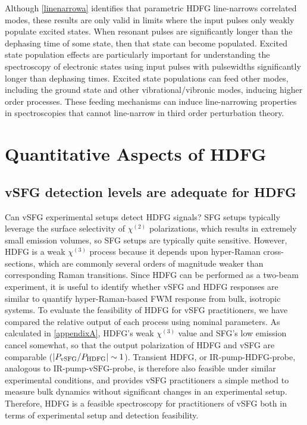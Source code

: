 \documentclass[aip, jcp, reprint, onecolumn, nofootinbib]{revtex4-2}
\begin{document}
Although \autoref{linenarrowa} identifies that parametric HDFG line-narrows correlated modes, these results are only valid in limits where the input pulses only weakly populate excited states.
When resonant pulses are significantly longer than the dephasing time of some state, then that state can become populated.
Excited state population effects are particularly important for understanding the spectroscopy of electronic states using input pulses with pulsewidths significantly longer than dephasing times. \cite{RN319, Yurs2012}
Excited state populations can feed other modes, including the ground state and other vibrational/vibronic modes, inducing higher order processes.\cite{Carlson87, RN471}
These feeding mechanisms can induce line-narrowing properties in spectroscopies that cannot line-narrow in third order perturbation theory.\cite{RN319, Carlson87, RN471}

\section{Quantitative Aspects of HDFG}\label{quant}
% 


\subsection{vSFG detection levels are adequate for HDFG}

Can vSFG experimental setups detect HDFG signals?
SFG setups typically leverage the surface selectivity of $\chi^{(2)}$ polarizations,\cite{RN132, RN133} which results in extremely small emission volumes, so SFG setups are typically quite sensitive.
However, HDFG is a weak $\chi^{(3)}$ process because it depends upon hyper-Raman cross-sections, which are commonly several orders of magnitude weaker than corresponding Raman transitions.\cite{RN515}
Since HDFG can be performed as a two-beam experiment, it is useful to identify whether vSFG and HDFG responses are similar to quantify hyper-Raman-based FWM response from bulk, isotropic systems.
To evaluate the feasibility of HDFG for vSFG practitioners, we have compared the relative output of each process using nominal parameters. 
As calculated in \autoref{appendixA}, HDFG's weak $\chi^{(3)}$ value and SFG's low emission cancel somewhat, so that the output polarization of HDFG and vSFG are comparable ($\abs{P_\text{vSFG} / P_\text{HDFG}} \sim 1$).
Transient HDFG, or IR-pump-HDFG-probe, analogous to IR-pump-vSFG-probe, is therefore also feasible under similar experimental conditions, and provides vSFG practitioners a simple method to measure bulk dynamics without significant changes in an experimental setup. 
Therefore, HDFG is a feasible spectroscopy for practitioners of vSFG both in terms of experimental setup and detection feasibility.
\end{document}
